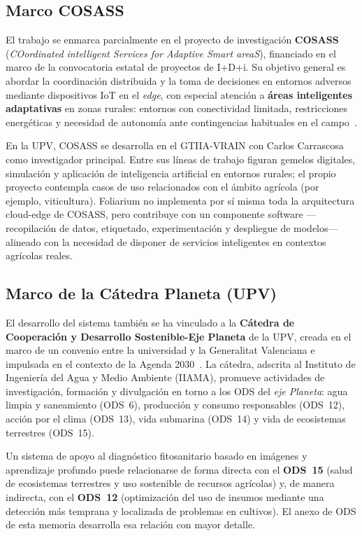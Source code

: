 \documentclass[11pt,spanish,listoffigures,listoftables]{tfgetsinf}
\begin{document}
\subsection{Marco COSASS}

El trabajo se enmarca parcialmente en el proyecto de investigación \textbf{COSASS} (\textit{COordinated intelligent Services for Adaptive Smart areaS}), financiado en el marco de la convocatoria estatal de proyectos de I+D+i. Su objetivo general es abordar la coordinación distribuida y la toma de decisiones en entornos adversos mediante dispositivos IoT en el \textit{edge}, con especial atención a \textbf{áreas inteligentes adaptativas} en zonas rurales: entornos con conectividad limitada, restricciones energéticas y necesidad de autonomía ante contingencias habituales en el campo~\cite{upv_cosass}.

En la UPV, COSASS se desarrolla en el GTIIA-VRAIN con Carlos Carrascosa como investigador principal. Entre sus líneas de trabajo figuran gemelos digitales, simulación y aplicación de inteligencia artificial en entornos rurales; el propio proyecto contempla casos de uso relacionados con el ámbito agrícola (por ejemplo, viticultura). Foliarium no implementa por sí misma toda la arquitectura cloud-edge de COSASS, pero contribuye con un componente software ---recopilación de datos, etiquetado, experimentación y despliegue de modelos--- alineado con la necesidad de disponer de servicios inteligentes en contextos agrícolas reales.

\subsection{Marco de la Cátedra Planeta (UPV)}

El desarrollo del sistema también se ha vinculado a la \textbf{Cátedra de Cooperación y Desarrollo Sostenible-Eje Planeta} de la UPV, creada en el marco de un convenio entre la universidad y la Generalitat Valenciana e impulsada en el contexto de la Agenda 2030~\cite{upv_caplanet}. La cátedra, adscrita al Instituto de Ingeniería del Agua y Medio Ambiente (IIAMA), promueve actividades de investigación, formación y divulgación en torno a los ODS del \textit{eje Planeta}: agua limpia y saneamiento (ODS~6), producción y consumo responsables (ODS~12), acción por el clima (ODS~13), vida submarina (ODS~14) y vida de ecosistemas terrestres (ODS~15).

Un sistema de apoyo al diagnóstico fitosanitario basado en imágenes y aprendizaje profundo puede relacionarse de forma directa con el \textbf{ODS~15} (salud de ecosistemas terrestres y uso sostenible de recursos agrícolas) y, de manera indirecta, con el \textbf{ODS~12} (optimización del uso de insumos mediante una detección más temprana y localizada de problemas en cultivos). El anexo de ODS de esta memoria desarrolla esa relación con mayor detalle.
\end{document}
